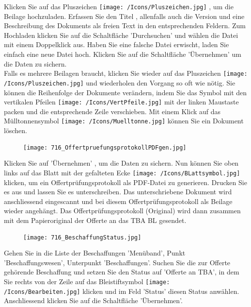 Klicken Sie auf das Pluszeichen \texttt{[image: /Icons/Pluszeichen.jpg]} , um die Beilage hochzuladen. Erfassen Sie den Titel , allenfalls auch die Version  und eine Beschreibung des Dokuments  als freien Text in den entsprechenden Feldern. Zum Hochladen klicken Sie auf die Schaltfläche 'Durchsuchen'  und wählen die Datei mit einem Doppelklick aus. Haben Sie eine falsche Datei erwischt, laden Sie einfach eine neue Datei hoch. Klicken Sie auf die Schaltfläche 'Übernehmen' um die Daten zu sichern. \\
Falls es mehrere Beilagen braucht, klicken Sie wieder auf das Pluszeichen \texttt{[image: /Icons/Pluszeichen.jpg]}  und wiederholen den Vorgang so oft wie nötig. Sie können die Reihenfolge der Dokumente verändern, indem Sie das Symbol mit den vertikalen Pfeilen \texttt{[image: /Icons/VertPfeile.jpg]}  mit der linken Maustaste packen und die entsprechende Zeile verschieben. Mit einem Klick auf das Mülltonnensymbol \texttt{[image: /Icons/Muelltonne.jpg]}  können Sie ein Dokument löschen.

\vspace{\baselineskip}

\begin{figure}
\vspace{-15pt}
\texttt{[image: 716\_OffertpruefungsprotokollPDFgen.jpg]}
\end{figure}
Klicken Sie auf 'Übernehmen' , um die Daten zu sichern. Nun können Sie oben links auf das
Blatt mit der gefalteten Ecke \texttt{[image: /Icons/BLattsymbol.jpg]} klicken, um ein Offertprüfungsprotokoll als PDF-Datei zu generieren. Drucken Sie es aus und lassen Sie es unterschreiben. Das unterschriebene Dokument wird anschliessend eingescannt und bei diesem Offertprüfungsprotokoll als
Beilage wieder angehängt. Das Offertprüfungsprotokoll (Original) wird dann zusammen mit dem Papieroriginal der Offerte an das TBA BL gesendet.

\vspace{\baselineskip}

\begin{figure}
\vspace{-15pt}
\texttt{[image: 716\_BeschaffungStatus.jpg]}
\end{figure}
Gehen Sie in die Liste der Beschaffungen 'Menüband', Punkt 'Beschaffungswesen', Unterpunkt 'Beschaffungen'. Suchen Sie die zur Offerte gehörende
Beschaffung und setzen Sie den Status auf 'Offerte an TBA', in dem Sie rechts von der Zeile auf das Bleistiftsymbol \texttt{[image: /Icons/Bearbeiten.jpg]} klicken und im Feld 'Status' diesen Status anwählen. Anschliessend klicken Sie auf die Schaltfläche 'Übernehmen'.

